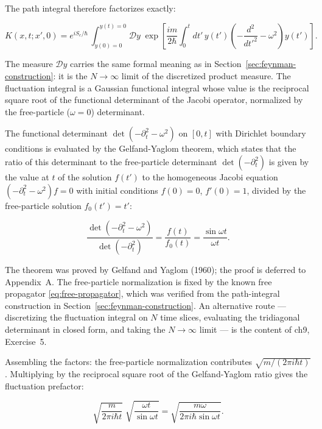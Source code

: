 The path integral therefore factorizes exactly:
\begin{linenomath}
\begin{equation}
K(x,t;x',0) = e^{iS_c/\hbar}\,
\int_{y(0)=0}^{y(t)=0} \mathcal{D}y\;
\exp\!\left[\frac{im}{2\hbar}\int_0^t dt'\,y(t')\!\left(-\frac{d^2}{dt'^2} - \omega^2\right)\!y(t')\right].
\end{equation}
\end{linenomath}
The measure $\mathcal{D}y$ carries the same formal meaning as in Section~\ref{sec:feynman-construction}: it is the $N\to\infty$ limit of the discretized product measure. The fluctuation integral is a Gaussian functional integral whose value is the reciprocal square root of the functional determinant of the Jacobi operator, normalized by the free-particle ($\omega = 0$) determinant.

\begin{note}
The functional determinant $\det(-\partial_t^2 - \omega^2)$ on $[0,t]$ with Dirichlet boundary conditions is evaluated by the Gelfand-Yaglom theorem, which states that the ratio of this determinant to the free-particle determinant $\det(-\partial_t^2)$ is given by the value at $t$ of the solution $f(t')$ to the homogeneous Jacobi equation $(-\partial_t^2 - \omega^2)f = 0$ with initial conditions $f(0) = 0$, $f'(0) = 1$, divided by the free-particle solution $f_0(t') = t'$:
\begin{linenomath}
\begin{equation}
\frac{\det(-\partial_t^2 - \omega^2)}{\det(-\partial_t^2)} = \frac{f(t)}{f_0(t)} = \frac{\sin\omega t}{\omega t}.
\end{equation}
\end{linenomath}
The theorem was proved by Gelfand and Yaglom (1960); the proof is deferred to Appendix~A. The free-particle normalization is fixed by the known free propagator \eqref{eq:free-propagator}, which was verified from the path-integral construction in Section~\ref{sec:feynman-construction}. An alternative route --- discretizing the fluctuation integral on $N$ time slices, evaluating the tridiagonal determinant in closed form, and taking the $N\to\infty$ limit --- is the content of ch9, Exercise~5.
\end{note}

Assembling the factors: the free-particle normalization contributes $\sqrt{m/(2\pi i\hbar t)}$. Multiplying by the reciprocal square root of the Gelfand-Yaglom ratio gives the fluctuation prefactor:
\begin{linenomath}
\begin{equation}
\sqrt{\frac{m}{2\pi i\hbar t}}\;\sqrt{\frac{\omega t}{\sin\omega t}}
= \sqrt{\frac{m\omega}{2\pi i\hbar\sin\omega t}}.
\end{equation}
\end{linenomath}

